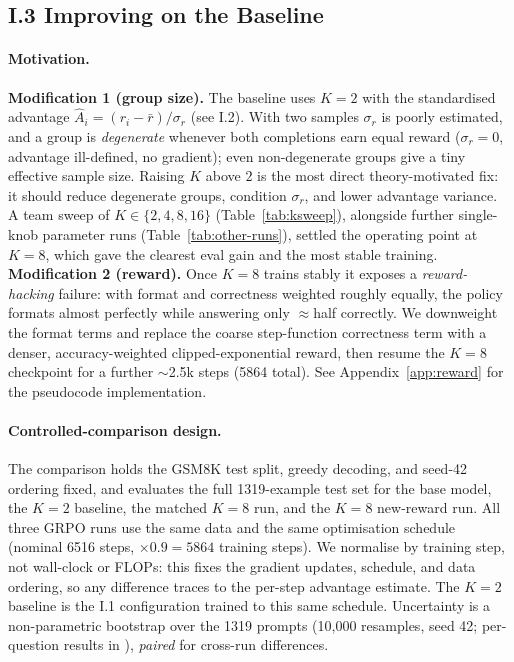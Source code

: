 \subsection{I.3 Improving on the Baseline}

\paragraph{Motivation.}
\textbf{Modification 1 (group size).} The baseline uses $K=2$ with the standardised advantage
$\hat A_i = (r_i - \bar r)/\sigma_r$ (see I.2). With two samples $\sigma_r$ is poorly estimated, and
a group is \emph{degenerate} whenever both completions earn equal reward ($\sigma_r=0$, advantage
ill-defined, no gradient); even non-degenerate groups give a tiny effective sample size. Raising
$K$ above $2$ is the most direct theory-motivated fix: it should reduce degenerate groups, condition
$\sigma_r$, and lower advantage variance. A team sweep of $K\in\{2,4,8,16\}$
(Table~\ref{tab:ksweep}), alongside further single-knob parameter runs (Table~\ref{tab:other-runs}),
settled the operating point at $K=8$, which gave the clearest eval gain and the most stable training.
\textbf{Modification 2 (reward).} Once $K=8$ trains stably it exposes a \emph{reward-hacking}
failure: with format and correctness weighted roughly equally, the policy formats almost perfectly
while answering only $\approx$half correctly. We downweight the format terms and replace the coarse
step-function correctness term with a denser, accuracy-weighted clipped-exponential reward, then
resume the $K=8$ checkpoint for a further $\sim$2.5k steps (5864 total). See Appendix~\ref{app:reward} for the pseudocode implementation.

\paragraph{Controlled-comparison design.}
\noindent
The comparison holds the GSM8K test split, greedy decoding, and seed-42 ordering fixed, and
evaluates the full 1319-example test set for the base model, the $K=2$ baseline, the matched
$K=8$ run, and the $K=8$ new-reward run. All three GRPO runs use the same data and the same
optimisation schedule (nominal 6516 steps, $\times 0.9 = 5864$ training steps). We normalise by
training step, not wall-clock or FLOPs: this fixes the gradient updates, schedule, and data
ordering, so any difference traces to the per-step advantage estimate. The $K=2$ baseline is the I.1
configuration trained to this same schedule. Uncertainty is a non-parametric bootstrap over the 1319
prompts (10{,}000 resamples, seed 42; per-question results in ), \emph{paired} for
cross-run differences.


